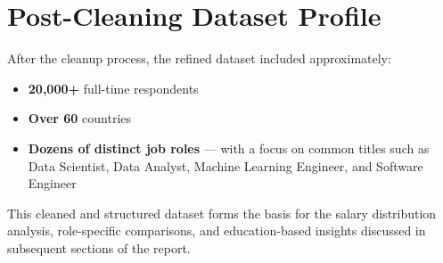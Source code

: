 \section{Post-Cleaning Dataset Profile}

After the cleanup process, the refined dataset included approximately:
\begin{itemize}
    \item \textbf{20,000+} full-time respondents
    \item \textbf{Over 60} countries
    \item \textbf{Dozens of distinct job roles} — with a focus on common titles such as Data Scientist, Data Analyst, Machine Learning Engineer, and Software Engineer
\end{itemize}

This cleaned and structured dataset forms the basis for the salary distribution analysis, role-specific comparisons, and education-based insights discussed in subsequent sections of the report.
